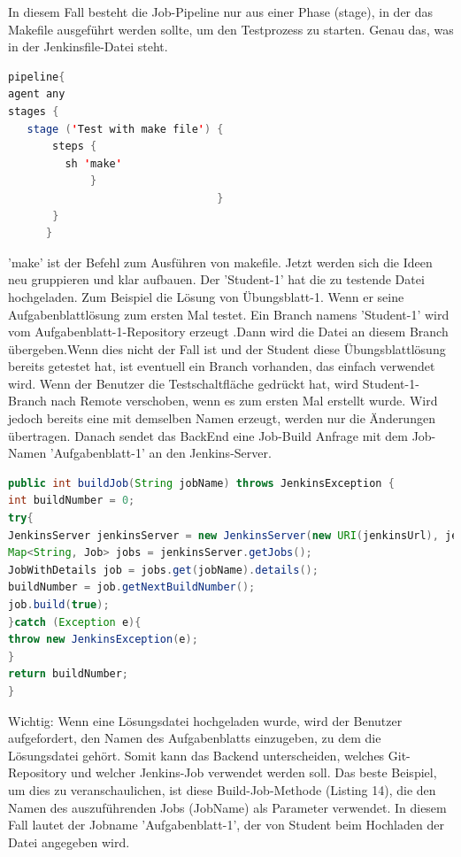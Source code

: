 \documentclass[a4paper,12pt,oneside]{book}
\begin{document}
\newline
In diesem Fall besteht die Job-Pipeline nur aus einer Phase (stage), in der das Makefile ausgeführt werden sollte, um den Testprozess zu starten. Genau das, was in der Jenkinsfile-Datei steht.
\begin{lstlisting}[language=JAVA,caption=Jenkinsfile (Job-Pipeline-Skript) ]
pipeline{
agent any
stages {   
   stage ('Test with make file') {
       steps {
         sh 'make'
             }
                                 }
       }
      }
\end{lstlisting} 
'make' ist der Befehl zum Ausführen von makefile.
\newline
Jetzt werden sich die Ideen neu gruppieren und klar aufbauen. Der 'Student-1' hat die zu testende Datei hochgeladen. Zum Beispiel die Lösung von Übungsblatt-1. Wenn er seine Aufgabenblattlösung zum ersten Mal testet. Ein Branch namens 'Student-1' wird vom Aufgabenblatt-1-Repository erzeugt .Dann wird die Datei an diesem Branch übergeben.Wenn dies nicht der Fall ist und der Student diese Übungsblattlösung bereits getestet hat, ist eventuell ein Branch vorhanden, das einfach verwendet wird. Wenn der Benutzer die Testschaltfläche gedrückt hat, wird Student-1-Branch nach Remote verschoben, wenn es zum ersten Mal erstellt wurde. Wird jedoch bereits eine mit demselben Namen erzeugt, werden nur die Änderungen übertragen. Danach sendet das BackEnd eine Job-Build Anfrage mit dem Job-Namen 'Aufgabenblatt-1' an den Jenkins-Server. 
\begin{lstlisting}[language=JAVA,caption=Job-Build Anfrage ]
	public int buildJob(String jobName) throws JenkinsException {
int buildNumber = 0;
try{
JenkinsServer jenkinsServer = new JenkinsServer(new URI(jenkinsUrl), jenkinsUser, jenkinsPassword);
Map<String, Job> jobs = jenkinsServer.getJobs();
JobWithDetails job = jobs.get(jobName).details();
buildNumber = job.getNextBuildNumber();
job.build(true);
}catch (Exception e){
throw new JenkinsException(e);
}
return buildNumber;
}
\end{lstlisting} 
Wichtig: Wenn eine Lösungsdatei hochgeladen wurde, wird der Benutzer aufgefordert, den Namen des Aufgabenblatts einzugeben, zu dem die Lösungsdatei gehört. Somit kann das Backend unterscheiden, welches Git-Repository und welcher Jenkins-Job verwendet werden soll. Das beste Beispiel, um dies zu veranschaulichen, ist diese Build-Job-Methode (Listing 14), die den Namen des auszuführenden Jobs (JobName) als Parameter verwendet. In diesem Fall lautet der Jobname 'Aufgabenblatt-1', der von Student beim Hochladen der Datei angegeben wird.
\end{document}
